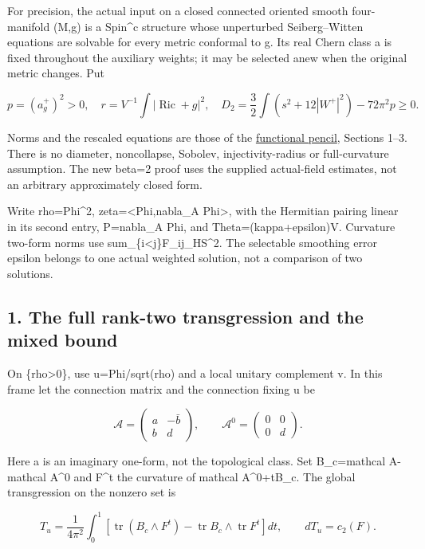 \documentclass[
  10pt,
]{article}
\begin{document}
For precision, the actual input on a closed connected oriented smooth
four-manifold (M,g) is a Spin\^{}c structure whose unperturbed
Seiberg--Witten equations are solvable for every metric conformal to g.
Its real Chern class a is fixed throughout the auxiliary weights; it may
be selected anew when the original metric changes. Put

\[
 p=(a_g^+)^2>0,\quad r=V^{-1}\int|\operatorname{Ric}+g|^2,\quad
 D_2=\frac32\int(s^2+12|W^+|^2)-72\pi^2p\ge0.
\]

Norms and the rescaled equations are those of the
\href{../mathematics/current/line1_functional_pencil.md}{functional
pencil}, Sections 1--3. There is no diameter, noncollapse, Sobolev,
injectivity-radius or full-curvature assumption. The new beta=2 proof
uses the supplied actual-field estimates, not an arbitrary approximately
closed form.

Write rho=\textbar Phi\textbar\^{}2, zeta=\textless Phi,nabla\_A
Phi\textgreater, with the Hermitian pairing linear in its second entry,
P=nabla\_A Phi, and Theta=(kappa+epsilon)V. Curvature two-form norms use
sum\_\{i\textless j\}\textbar F\_ij\textbar\_HS\^{}2. The selectable
smoothing error epsilon belongs to one actual weighted solution, not a
comparison of two solutions.

\hypertarget{the-full-rank-two-transgression-and-the-mixed-bound}{%
\subsection{1. The full rank-two transgression and the mixed
bound}\label{the-full-rank-two-transgression-and-the-mixed-bound}}

On \{rho\textgreater0\}, use u=Phi/sqrt(rho) and a local unitary
complement v. In this frame let the connection matrix and the connection
fixing u be

\[
 \mathcal A=\begin{pmatrix}a&-\bar b\\b&d\end{pmatrix},
 \qquad \mathcal A^0=\begin{pmatrix}0&0\\0&d\end{pmatrix}.
\]

Here a is an imaginary one-form, not the topological class. Set
B\_c=mathcal A-mathcal A\^{}0 and F\^{}t the curvature of mathcal
A\^{}0+tB\_c. The global transgression on the nonzero set is

\[
 T_u=\frac1{4\pi^2}\int_0^1
 [\operatorname{tr}(B_c\wedge F^t)
       -\operatorname{tr}B_c\wedge\operatorname{tr}F^t]dt,
 \qquad dT_u=c_2(F).
\]
\end{document}
